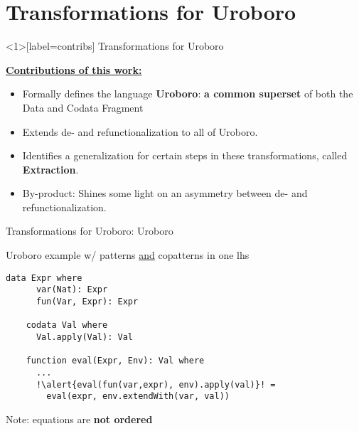 \documentclass[xcolor=svgnames]{beamer}
\begin{document}
\section
  {Transformations for Uroboro}


\begin{frame}<1>[label=contribs]
  {Transformations for Uroboro}

  \underline{\textbf{Contributions of this work:}}

  \begin{itemize}
  \item \alert<2>{Formally defines the language \textbf{Uroboro}: \textbf{a common superset} of both the Data and Codata Fragment}

  \item \alert<3>{Extends de- and refunctionalization to all of Uroboro.}

  \item \alert<4>{Identifies a generalization for certain steps in these transformations, called \textbf{Extraction}.}

  \item \alert<5>{By-product: Shines some light on an asymmetry between de- and refunctionalization.}
   \end{itemize}
\end{frame}


\begin{frame}[fragile]
  {Transformations for Uroboro: Uroboro}

  \begin{block}{Uroboro example w/ patterns \underline{and} copatterns in one lhs}
    \begin{lstlisting}[escapechar=!]
    data Expr where
      var(Nat): Expr
      fun(Var, Expr): Expr

    codata Val where
      Val.apply(Val): Val

    function eval(Expr, Env): Val where
      ...
      !\alert{eval(fun(var,expr), env).apply(val)}! = 
        eval(expr, env.extendWith(var, val))
    \end{lstlisting}
  \end{block}

  Note: equations are \textbf{not ordered}
\end{frame}
\end{document}
